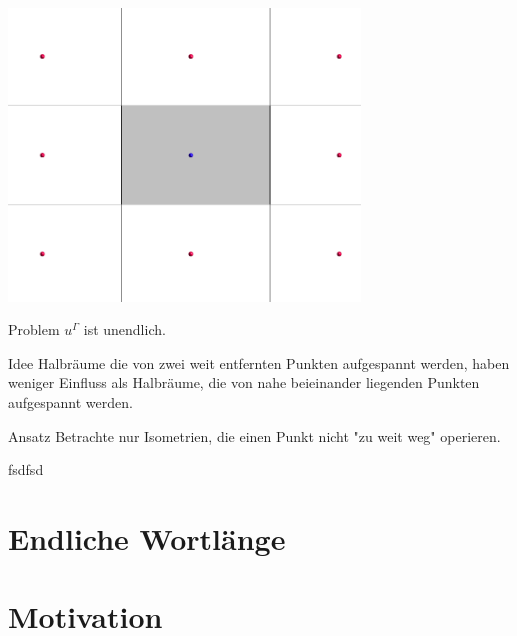 \documentclass{beamer}
\theoremstyle{plain}
\begin{document}
\begin{frame}
    \centering
    \includegraphics[width=0.7\textwidth]{images/dirichlet-example.png}
\end{frame}

\begin{frame}
    \begin{alertblock}{Problem}
        $u^\Gamma$ ist unendlich.
    \end{alertblock}
\end{frame}

\begin{frame}
    \begin{block}{Idee}
        Halbräume die von zwei weit entfernten Punkten aufgespannt werden, haben weniger Einfluss als Halbräume, die von nahe beieinander liegenden Punkten aufgespannt werden.
    \end{block}
    \pause
    \begin{block}{Ansatz}
        Betrachte nur Isometrien, die einen Punkt nicht "zu weit weg" operieren.
    \end{block}
\end{frame}

\begin{frame}
    fsdfsd
\end{frame}

\section{Endliche Wortlänge}

\section{Motivation}

\begin{frame}
    \printbibliography
\end{frame}
\end{document}
